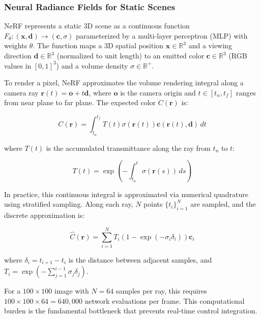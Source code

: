 \documentclass[12pt,a4paper,oneside]{report}
\begin{document}
\subsubsection{Neural Radiance Fields for Static Scenes}

NeRF represents a static 3D scene as a continuous function $F_\theta: (\mathbf{x}, \mathbf{d}) \rightarrow (\mathbf{c}, \sigma)$ parameterized by a multi-layer perceptron (MLP) with weights $\theta$. The function maps a 3D spatial position $\mathbf{x} \in \mathbb{R}^3$ and a viewing direction $\mathbf{d} \in \mathbb{R}^3$ (normalized to unit length) to an emitted color $\mathbf{c} \in \mathbb{R}^3$ (RGB values in $[0,1]^3$) and a volume density $\sigma \in \mathbb{R}^+$.

To render a pixel, NeRF approximates the volume rendering integral along a camera ray $\mathbf{r}(t) = \mathbf{o} + t\mathbf{d}$, where $\mathbf{o}$ is the camera origin and $t \in [t_n, t_f]$ ranges from near plane to far plane. The expected color $C(\mathbf{r})$ is:

\begin{equation}
C(\mathbf{r}) = \int_{t_n}^{t_f} T(t) \sigma(\mathbf{r}(t)) \mathbf{c}(\mathbf{r}(t), \mathbf{d}) \, dt
\end{equation}

where $T(t)$ is the accumulated transmittance along the ray from $t_n$ to $t$:

\begin{equation}
T(t) = \exp\left(-\int_{t_n}^{t} \sigma(\mathbf{r}(s)) \, ds\right)
\end{equation}

In practice, this continuous integral is approximated via numerical quadrature using stratified sampling. Along each ray, $N$ points $\{t_i\}_{i=1}^N$ are sampled, and the discrete approximation is:

\begin{equation}
\hat{C}(\mathbf{r}) = \sum_{i=1}^{N} T_i (1 - \exp(-\sigma_i \delta_i)) \mathbf{c}_i
\end{equation}

where $\delta_i = t_{i+1} - t_i$ is the distance between adjacent samples, and $T_i = \exp\left(-\sum_{j=1}^{i-1} \sigma_j \delta_j\right)$.

For a $100 \times 100$ image with $N = 64$ samples per ray, this requires $100 \times 100 \times 64 = 640,000$ network evaluations per frame. This computational burden is the fundamental bottleneck that prevents real-time control integration.
\end{document}
